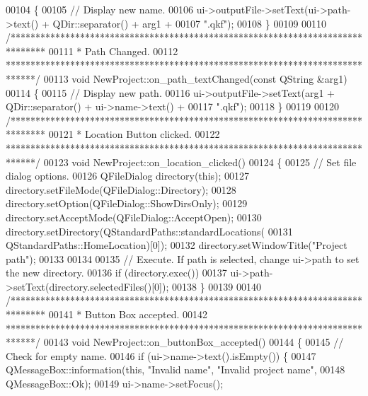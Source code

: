 \begin{DoxyCode}
00104 \{
00105   \textcolor{comment}{// Display new name.}
00106   ui->outputFile->setText(ui->path->text() + QDir::separator() + arg1 +
00107                           \textcolor{stringliteral}{".qkf"});
00108 \}
00109 
00110 \textcolor{comment}{/*******************************************************************************}
00111 \textcolor{comment}{ * Path Changed.}
00112 \textcolor{comment}{ ******************************************************************************/}
00113 \textcolor{keywordtype}{void} NewProject::on\_path\_textChanged(\textcolor{keyword}{const} QString &arg1)
00114 \{
00115   \textcolor{comment}{// Display new path.}
00116   ui->outputFile->setText(arg1 + QDir::separator() + ui->name->text() +
00117                           \textcolor{stringliteral}{".qkf"});
00118 \}
00119 
00120 \textcolor{comment}{/*******************************************************************************}
00121 \textcolor{comment}{ * Location Button clicked.}
00122 \textcolor{comment}{ ******************************************************************************/}
00123 \textcolor{keywordtype}{void} NewProject::on\_location\_clicked()
00124 \{
00125   \textcolor{comment}{// Set file dialog options.}
00126   QFileDialog directory(\textcolor{keyword}{this});
00127   directory.setFileMode(QFileDialog::Directory);
00128   directory.setOption(QFileDialog::ShowDirsOnly);
00129   directory.setAcceptMode(QFileDialog::AcceptOpen);
00130   directory.setDirectory(QStandardPaths::standardLocations(
00131                            QStandardPaths::HomeLocation)[0]);
00132   directory.setWindowTitle(\textcolor{stringliteral}{"Project path"});
00133 
00134 
00135   \textcolor{comment}{// Execute. If path is selected, change ui->path to set the new directory.}
00136   \textcolor{keywordflow}{if} (directory.exec())
00137     ui->path->setText(directory.selectedFiles()[0]);
00138 \}
00139 
00140 \textcolor{comment}{/*******************************************************************************}
00141 \textcolor{comment}{ * Button Box accepted.}
00142 \textcolor{comment}{ ******************************************************************************/}
00143 \textcolor{keywordtype}{void} NewProject::on\_buttonBox\_accepted()
00144 \{
00145   \textcolor{comment}{// Check for empty name.}
00146   \textcolor{keywordflow}{if} (ui->name->text().isEmpty()) \{
00147     QMessageBox::information(\textcolor{keyword}{this}, \textcolor{stringliteral}{"Invalid name"}, \textcolor{stringliteral}{"Invalid project name"},
00148                              QMessageBox::Ok);
00149     ui->name->setFocus();

\end{DoxyCode}

